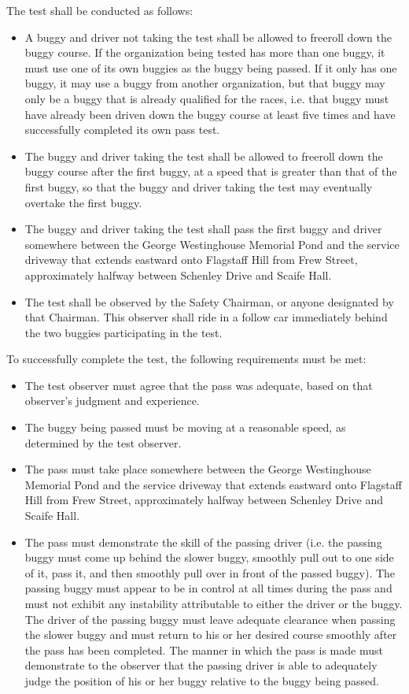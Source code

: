 \documentclass[openany]{book}
\begin{document}
The test shall be conducted as follows:
\begin{itemize}
	\item A buggy and driver not taking the test shall be allowed to freeroll down the buggy course. If the organization being tested has more than one buggy, it must use one of its own buggies as the buggy being passed. If it only has one buggy, it may use a buggy from another organization, but that buggy may only be a buggy that is already qualified for the races, i.e. that buggy must have already been driven down the buggy course at least five times and have successfully completed its own pass test.
	\item The buggy and driver taking the test shall be allowed to freeroll down the buggy course after the first buggy, at a speed that is greater than that of the first buggy, so that the buggy and driver taking the test may eventually overtake the first buggy.
	\item The buggy and driver taking the test shall pass the first buggy and driver somewhere between the George Westinghouse Memorial Pond and the service driveway that extends eastward onto Flagstaff Hill from Frew Street, approximately halfway between Schenley Drive and Scaife Hall.
	\item The test shall be observed by the Safety Chairman, or anyone designated by that Chairman. This observer shall ride in a follow car immediately behind the two buggies participating in the test.
\end{itemize}

To successfully complete the test, the following requirements must be met:
\begin{itemize}
	\item The test observer must agree that the pass was adequate, based on that observer's judgment and experience.
	\item The buggy being passed must be moving at a reasonable speed, as determined by the test observer.
	\item The pass must take place somewhere between the George Westinghouse Memorial Pond and the service driveway that extends eastward onto Flagstaff Hill from Frew Street, approximately halfway between Schenley Drive and Scaife Hall.
	\item The pass must demonstrate the skill of the passing driver (i.e. the passing buggy must come up behind the slower buggy, smoothly pull out to one side of it, pass it, and then smoothly pull over in front of the passed buggy). The passing buggy must appear to be in control at all times during the pass and must not exhibit any instability attributable to either the driver or the buggy. The driver of the passing buggy must leave adequate clearance when passing the slower buggy and must return to his or her desired course smoothly after the pass has been completed. The manner in which the pass is made must demonstrate to the observer that the passing driver is able to adequately judge the position of his or her buggy relative to the buggy being passed.
\end{itemize}
\end{document}
